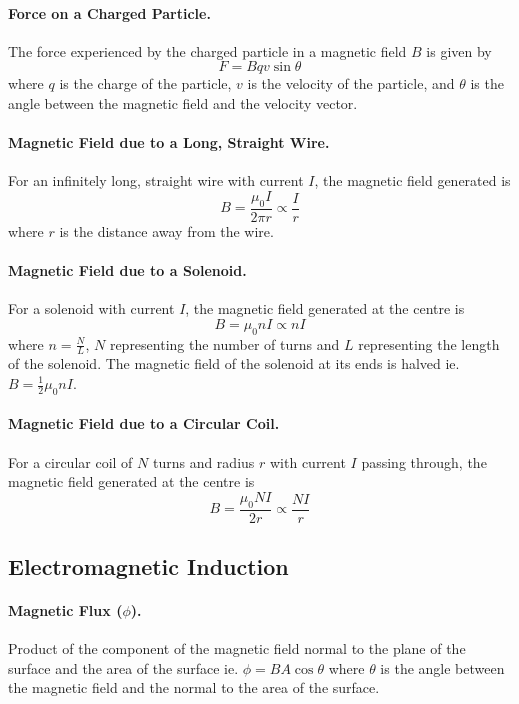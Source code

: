 \documentclass{article}
\begin{document}
\paragraph{Force on a Charged Particle.} The force experienced by the charged
particle in a magnetic field $B$ is given by \begin{equation} F = Bqv\sin\theta
\end{equation} where $q$ is the charge of the particle, $v$ is the velocity of
the particle, and $\theta$ is the angle between the magnetic field and the
velocity vector.

\paragraph{Magnetic Field due to a Long, Straight Wire.} For an infinitely long,
straight wire with current $I$, the magnetic field generated is \begin{equation}
B = \frac{\mu_0I}{2\pi r} \propto \frac{I}{r} \end{equation} where $r$ is the
distance away from the wire.

\paragraph{Magnetic Field due to a Solenoid.} For a solenoid with current $I$,
the magnetic field generated at the centre is \begin{equation} B = \mu_0nI
\propto nI \end{equation} where $n = \frac{N}{L}$, $N$ representing the number
of turns and $L$ representing the length of the solenoid. The magnetic field of
the solenoid at its ends is halved ie. $B = \frac{1}{2}\mu_0nI$.

\paragraph{Magnetic Field due to a Circular Coil.} For a circular coil of $N$
turns and radius $r$ with current $I$ passing through, the magnetic field
generated at the centre is \begin{equation} B = \frac{\mu_0NI}{2r} \propto
\frac{NI}{r} \end{equation}

\subsection{Electromagnetic Induction}

\paragraph{Magnetic Flux ($\phi$).} Product of the component of the magnetic
field normal to the plane of the surface and the area of the surface ie. $\phi =
BA\cos\theta$ where $\theta$ is the angle between the magnetic field and the
normal to the area of the surface.
\end{document}
